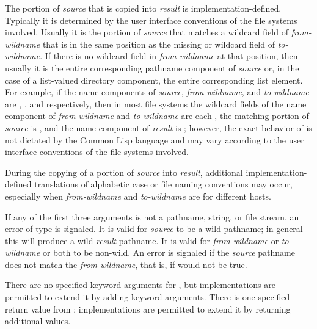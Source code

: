 \begin{newer}
\begin{defun}[Function]
    The portion of {\it source} that is copied into {\it result} is
    implementation-defined.  Typically it is determined by the user interface conventions
    of the file systems involved.  Usually it is the portion of {\it source}
    that matches a wildcard field of {\it from-wildname} that is in the same
    position as the missing or wildcard field of {\it to-wildname}.  If there
    is no wildcard field in {\it from-wildname} at that position, then usually
    it is the entire corresponding pathname component of {\it source} or, in
    the case of a list-valued directory component, the entire corresponding
    list element.  For example, if the name components of {\it source},
    {\it from-wildname}, and {\it to-wildname} are , , and 
    respectively, then in most file systems the wildcard fields of the
    name component of {\it from-wildname} and {\it to-wildname} are each , the
    matching portion of {\it source} is , and the name component of
    {\it result} is ; however, the exact behavior of 
    is not dictated by the Common Lisp language and may
    vary according to the user interface conventions of the file systems
    involved.

    During the copying of a portion of {\it source} into {\it result}, additional
    implementation-defined translations of alphabetic case or file naming
    conventions may occur, especially when {\it from-wildname} and
    {\it to-wildname} are for different hosts.

    If any of the first three arguments is not a pathname, string, or file
    stream, an error of type  is signaled.  It is valid for
    {\it source} to be a wild pathname; in general this will produce a wild
    {\it result} pathname.  It is valid for {\it from-wildname} or {\it to-wildname} or both
    to be non-wild.  An error is signaled if the {\it source} pathname does not
    match the {\it from-wildname}, that is,
    if  would not be true.
    
    There are no specified keyword arguments for , but
    implementations are permitted to extend it by adding keyword arguments.
    There is one specified return value from ;
    implementations are permitted to extend it by returning additional
    values.


\end{defun}
\end{newer}
